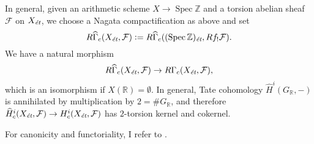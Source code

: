 \documentclass[leqno,12pt]{article}
\theoremstyle{plain}
\theoremstyle{definition}
\DeclareMathOperator{\Spec}{Spec}
\newcommand{\RR}{\mathbb{R}}
\newcommand{\ZZ}{\mathbb{Z}}
\newcommand{\dfn}{\mathrel{\mathop:}=}
\newcommand{\et}{\text{\it \'{e}t}}
\begin{document}
In general, given an arithmetic scheme $X \to \Spec \ZZ$ and a torsion abelian
sheaf $\mathcal{F}$ on $X_\et$, we choose a Nagata compactification as above and
set
\[ R\widehat{\Gamma}_c (X_\et, \mathcal{F}) \dfn
  R\widehat{\Gamma}_c ((\Spec \ZZ)_\et, R f_! \mathcal{F}). \]
We have a natural morphism
$$R\widehat{\Gamma}_c (X_\et, \mathcal{F}) \to R\Gamma_c (X_\et, \mathcal{F}),$$
which is an isomorphism if $X (\RR) = \emptyset$. In general, Tate cohomology
$\widehat{H}^i (G_\RR, -)$ is annihilated by multiplication by $2 = \# G_\RR$,
and therefore
$\widehat{H}^i_c (X_\et,\mathcal{F}) \to H^i_c (X_\et,\mathcal{F})$ has
$2$-torsion kernel and cokernel.

For canonicity and functoriality, I refer to \cite[\S 2]{Geisser-Schmidt-2018}.

\end{document}
